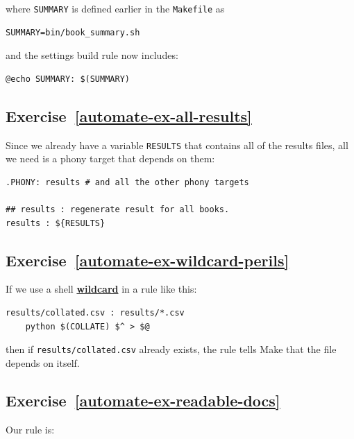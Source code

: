 \documentclass[
]{krantz}
\newcommand{\gref}[2]{\hyperlink{#2}{\textbf{#1}}}
\begin{document}
where \texttt{SUMMARY} is defined earlier in the \texttt{Makefile} as

\begin{verbatim}
SUMMARY=bin/book_summary.sh
\end{verbatim}

and the settings build rule now includes:

\begin{verbatim}
@echo SUMMARY: $(SUMMARY)
\end{verbatim}

\hypertarget{exercise-refautomate-ex-all-results}{%
\subsection*{Exercise~\ref{automate-ex-all-results}}\label{exercise-refautomate-ex-all-results}}


Since we already have a variable \texttt{RESULTS} that contains all of the results files,
all we need is a phony target that depends on them:

\begin{verbatim}
.PHONY: results # and all the other phony targets

## results : regenerate result for all books.
results : ${RESULTS}
\end{verbatim}

\hypertarget{exercise-refautomate-ex-wildcard-perils}{%
\subsection*{Exercise~\ref{automate-ex-wildcard-perils}}\label{exercise-refautomate-ex-wildcard-perils}}


If we use a shell \gref{wildcard}{wildcard} in a rule like this:

\begin{verbatim}
results/collated.csv : results/*.csv
    python $(COLLATE) $^ > $@
\end{verbatim}

then if \texttt{results/collated.csv} already exists,
the rule tells Make that the file depends on itself.

\hypertarget{exercise-refautomate-ex-readable-docs}{%
\subsection*{Exercise~\ref{automate-ex-readable-docs}}\label{exercise-refautomate-ex-readable-docs}}


Our rule is:
\end{document}
